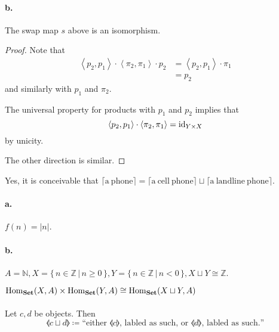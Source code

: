 \paragraph{b.}
\begin{thm}
  The swap map $s$ above is an isomorphism.
\end{thm}
\begin{proof}
  Note that
  \begin{align*}
    \left\langle p_2 , p_1 \right\rangle \cdot
    \left\langle \pi_2 , \pi_1 \right\rangle \cdot
    p_2
    &= \left\langle p_2 , p_1 \right\rangle \cdot
      \pi_1 \\
    &= p_2
  \end{align*}
  and similarly with $p_1$ and $\pi_2$.

  The universal property for products with
  $p_1$ and $p_2$ implies that
  \begin{equation*}
    \left\langle p_2 , p_1 \right\rangle \cdot
    \left\langle \pi_2 , \pi_1 \right\rangle =
    \mathrm{id}_{Y \times X}
  \end{equation*}
  by unicity.

  The other direction is similar.
\end{proof}


Yes, it is conceivable that
$\lceil\mathrm{a\ phone}\rceil =
\lceil\mathrm{a\ cell\ phone}\rceil \sqcup
\lceil\mathrm{a\ landline\ phone}\rceil$.


\paragraph{a.}
$f(n) = \lvert n \rvert$.
\paragraph{b.}
$A = \mathbb{N},
X = \{\,n \in \mathbb{Z} \,\vert\, n \geqslant 0\,\},
Y = \{\,n \in \mathbb{Z} \,\vert\, n < 0\,\},
X \sqcup Y \cong \mathbb{Z}$.


$\mathrm{Hom}_{\mathbf{Set}}(X,A) \times \mathrm{Hom}_{\mathbf{Set}}(Y,A) \cong \mathrm{Hom}_{\mathbf{Set}}(X \sqcup Y,A)$


\paragraph{}
Let $c,d$ be objects.  Then
\begin{equation*}
  \llangle c \sqcup d \rrangle \coloneqq
  \textrm{``either $\llangle c \rrangle$, labled as such, or $\llangle
    d \rrangle$, labled as such.''}
\end{equation*}

